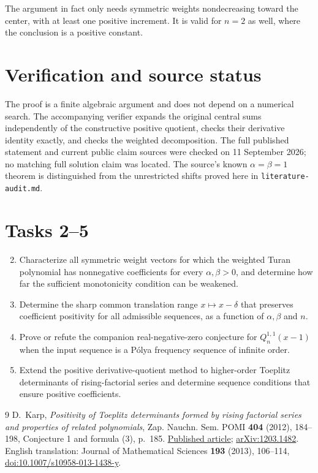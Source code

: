 \documentclass[10pt]{article}
\begin{document}
The argument in fact only needs symmetric weights nondecreasing
toward the center, with at least one positive increment.
It is valid for $n=2$ as well, where the conclusion is a positive constant.

\section*{Verification and source status}

The proof is a finite algebraic argument and does not depend on a numerical
search. The accompanying verifier expands the original central sums
independently of the constructive positive quotient, checks their
derivative identity exactly, and checks the weighted decomposition.
The full published statement and current public claim sources were
checked on 11 September 2026; no matching full solution claim was located.
The source's known $\alpha=\beta=1$ theorem is distinguished from the
unrestricted shifts proved here in \texttt{literature-audit.md}.

\section*{Tasks 2--5}

\begin{enumerate}
\setcounter{enumi}{1}
\item Characterize all symmetric weight vectors for which the weighted
Turan polynomial has nonnegative coefficients for every $\alpha,\beta>0$,
and determine how far the sufficient monotonicity condition can be weakened.
\item Determine the sharp common translation range $x\mapsto x-\delta$
that preserves coefficient positivity for all admissible sequences,
as a function of $\alpha,\beta$ and $n$.
\item Prove or refute the companion real-negative-zero conjecture for
$Q_n^{1,1}(x-1)$ when the input sequence is a P\'olya frequency sequence
of infinite order.
\item Extend the positive derivative-quotient method to higher-order
Toeplitz determinants of rising-factorial series and determine sequence
conditions that ensure positive coefficients.
\end{enumerate}

\begin{thebibliography}{9}
D.~Karp, \emph{Positivity of Toeplitz determinants formed by rising
factorial series and properties of related polynomials},
Zap. Nauchn. Sem. POMI \textbf{404} (2012), 184--198,
Conjecture 1 and formula (3), p.~185.
\href{https://www.mathnet.ru/eng/znsl5267}{Published article};
\href{https://arxiv.org/abs/1203.1482}{arXiv:1203.1482}.
English translation: Journal of Mathematical Sciences
\textbf{193} (2013), 106--114,
\href{https://doi.org/10.1007/s10958-013-1438-y}
{doi:10.1007/s10958-013-1438-y}.
\end{thebibliography}
\end{document}

